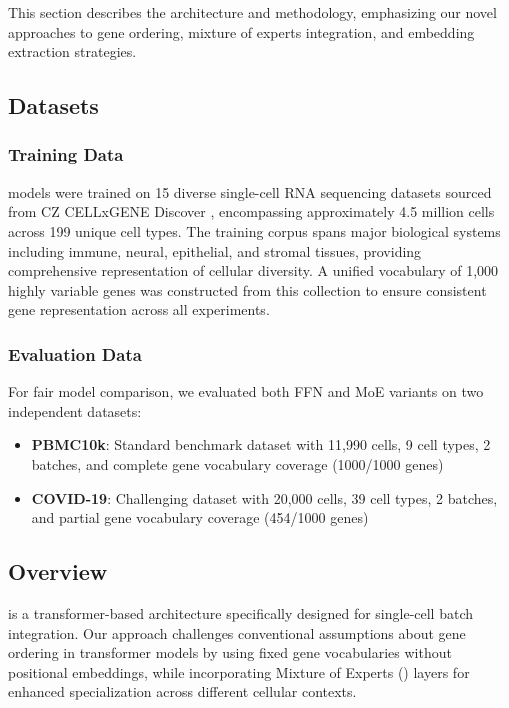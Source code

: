 This section describes the \bioformer{} architecture and methodology, emphasizing our novel approaches to gene ordering, mixture of experts integration, and embedding extraction strategies.

\subsection{Datasets}

\subsubsection{Training Data}

\bioformer{} models were trained on 15 diverse single-cell RNA sequencing datasets sourced from CZ CELLxGENE Discover \cite{czicellxgene_dataset}, encompassing approximately 4.5 million cells across 199 unique cell types. The training corpus spans major biological systems including immune, neural, epithelial, and stromal tissues, providing comprehensive representation of cellular diversity. A unified vocabulary of 1,000 highly variable genes was constructed from this collection to ensure consistent gene representation across all experiments.

\subsubsection{Evaluation Data}

For fair model comparison, we evaluated both FFN and MoE variants on two independent datasets:

\begin{itemize}
\item \textbf{PBMC10k}: Standard benchmark dataset \cite{pbmc10k_dataset} with 11,990 cells, 9 cell types, 2 batches, and complete gene vocabulary coverage (1000/1000 genes)
\item \textbf{COVID-19}: Challenging dataset \cite{covid19_dataset} with 20,000 cells, 39 cell types, 2 batches, and partial gene vocabulary coverage (454/1000 genes)
\end{itemize}

\subsection{Overview}

\bioformer{} is a transformer-based architecture specifically designed for single-cell batch integration. Our approach challenges conventional assumptions about gene ordering in transformer models by using fixed gene vocabularies without positional embeddings, while incorporating Mixture of Experts (\moe{}) layers for enhanced specialization across different cellular contexts.

